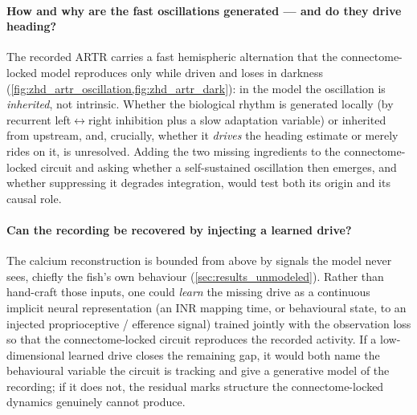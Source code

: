 \documentclass[11pt]{article}
\begin{document}
\paragraph{How and why are the fast oscillations generated --- and do they
drive heading?}\label{out:oscillation} The recorded ARTR carries a fast hemispheric alternation
that the connectome-locked model reproduces only while driven and loses in
darkness (\cref{fig:zhd_artr_oscillation,fig:zhd_artr_dark}): in the model
the oscillation is \emph{inherited}, not intrinsic. Whether the biological
rhythm is generated locally (by recurrent left$\leftrightarrow$right
inhibition plus a slow adaptation variable) or inherited from upstream,
and, crucially, whether it \emph{drives} the heading estimate or merely
rides on it, is unresolved. Adding the two missing ingredients to the
connectome-locked circuit and asking whether a self-sustained oscillation
then emerges, and whether suppressing it degrades integration, would test
both its origin and its causal role.

\paragraph{Can the recording be recovered by injecting a learned drive?}\label{out:inr}
The calcium reconstruction is bounded from above by signals the model never
sees, chiefly the fish's own behaviour (\cref{sec:results_unmodeled}).
Rather than hand-craft those inputs, one could \emph{learn} the missing
drive as a continuous implicit neural representation (an INR mapping time,
or behavioural state, to an injected proprioceptive / efference signal)
trained jointly with the observation loss so that the connectome-locked
circuit reproduces the recorded activity. If a low-dimensional learned
drive closes the remaining gap, it would both name the behavioural variable
the circuit is tracking and give a generative model of the recording; if it
does not, the residual marks structure the connectome-locked dynamics
genuinely cannot produce.
\end{document}
